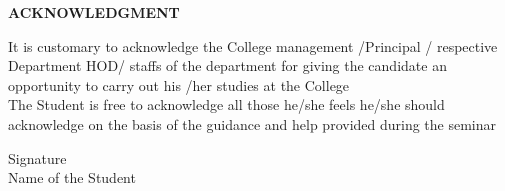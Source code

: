 \newpage
\vspace{2cm}

\begin{center}
\large \textbf{ACKNOWLEDGMENT}
\end{center}

\vspace{0.5cm}

 


It is customary to acknowledge the College management /Principal / respective Department HOD/ staffs of the department for giving the candidate an opportunity to carry out his /her studies at the College\\


The Student is free to acknowledge all those he/she feels he/she should acknowledge on the basis of the guidance and help provided during the seminar

\vspace{2cm}

\begin{flushright}

Signature\\
Name of the Student 
\end{flushright}


